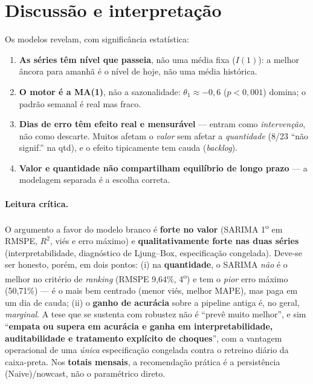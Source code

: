 \documentclass[11pt,a4paper]{article}
\begin{document}
\section{Discussão e interpretação}
\label{sec:disc}

Os modelos revelam, com significância estatística:
\begin{enumerate}\setlength\itemsep{2pt}
\item \textbf{As séries têm nível que passeia}, não uma média fixa ($I(1)$): a melhor âncora para
amanhã é o nível de hoje, não uma média histórica.
\item \textbf{O motor é a MA(1)}, não a sazonalidade: $\theta_1\approx-0{,}6$ ($p<0{,}001$) domina;
o padrão semanal é real mas fraco.
\item \textbf{Dias de erro têm efeito real e mensurável} --- entram como \emph{intervenção}, não
como descarte. Muitos afetam o \emph{valor} sem afetar a \emph{quantidade} (8/23 ``não signif.'' na
qtd), e o efeito tipicamente tem cauda (\emph{backlog}).
\item \textbf{Valor e quantidade não compartilham equilíbrio de longo prazo} --- a modelagem
separada é a escolha correta.
\end{enumerate}

\paragraph{Leitura crítica.} O argumento a favor do modelo branco é \textbf{forte no valor}
(SARIMA 1\textsuperscript{o} em RMSPE, $R^2$, viés e erro máximo) e \textbf{qualitativamente forte
nas duas séries} (interpretabilidade, diagnóstico de Ljung--Box, especificação congelada). Deve-se
ser honesto, porém, em dois pontos: (i) na \textbf{quantidade}, o SARIMA \emph{não} é o melhor no
critério de \emph{ranking} (RMSPE 9,64\%, 4\textsuperscript{o}) e tem o \emph{pior} erro máximo
(50,71\%) --- é o mais bem centrado (menor viés, melhor MAPE), mas paga em um dia de cauda; (ii) o
\textbf{ganho de acurácia} sobre a pipeline antiga é, no geral, \emph{marginal}. A tese que se
sustenta com robustez não é ``prevê muito melhor'', e sim ``\textbf{empata ou supera em acurácia e
ganha em interpretabilidade, auditabilidade e tratamento explícito de choques}'', com a vantagem
operacional de uma \emph{única} especificação congelada contra o retreino diário da caixa-preta.
Nos \textbf{totais mensais}, a recomendação prática é a persistência (Naive)/nowcast, não o
paramétrico direto.
\end{document}
